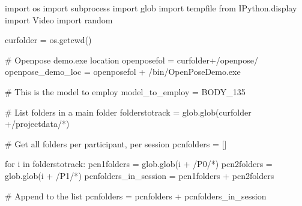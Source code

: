 \documentclass[
  letterpaper,
  DIV=11,
  numbers=noendperiod]{scrreprt}
\newenvironment{Shaded}{\begin{snugshade}}{\end{snugshade}}
\newcommand{\CommentTok}[1]{\textcolor[rgb]{0.37,0.37,0.37}{#1}}
\newcommand{\ControlFlowTok}[1]{\textcolor[rgb]{0.00,0.23,0.31}{#1}}
\newcommand{\ImportTok}[1]{\textcolor[rgb]{0.00,0.46,0.62}{#1}}
\newcommand{\KeywordTok}[1]{\textcolor[rgb]{0.00,0.23,0.31}{#1}}
\newcommand{\NormalTok}[1]{\textcolor[rgb]{0.00,0.23,0.31}{#1}}
\newcommand{\OperatorTok}[1]{\textcolor[rgb]{0.37,0.37,0.37}{#1}}
\newcommand{\StringTok}[1]{\textcolor[rgb]{0.13,0.47,0.30}{#1}}
\begin{document}
\begin{Shaded}
\begin{Highlighting}[]
\ImportTok{import}\NormalTok{ os}
\ImportTok{import}\NormalTok{ subprocess}
\ImportTok{import}\NormalTok{ glob}
\ImportTok{import}\NormalTok{ tempfile}
\ImportTok{from}\NormalTok{ IPython.display }\ImportTok{import}\NormalTok{ Video}
\ImportTok{import}\NormalTok{ random}

\NormalTok{curfolder }\OperatorTok{=}\NormalTok{ os.getcwd()}

\CommentTok{\# Openpose demo.exe location}
\NormalTok{openposefol }\OperatorTok{=}\NormalTok{ curfolder}\OperatorTok{+}\StringTok{\textquotesingle{}/openpose/\textquotesingle{}}
\NormalTok{openpose\_demo\_loc }\OperatorTok{=}\NormalTok{ openposefol }\OperatorTok{+} \StringTok{\textquotesingle{}/bin/OpenPoseDemo.exe\textquotesingle{}}

\CommentTok{\# This is the model to employ}
\NormalTok{model\_to\_employ }\OperatorTok{=} \StringTok{\textquotesingle{}BODY\_135\textquotesingle{}}

\CommentTok{\# List folders in a main folder}
\NormalTok{folderstotrack }\OperatorTok{=}\NormalTok{ glob.glob(curfolder }\OperatorTok{+}\StringTok{\textquotesingle{}/projectdata/*\textquotesingle{}}\NormalTok{)}

\CommentTok{\# Get all folders per participant, per session}
\NormalTok{pcnfolders }\OperatorTok{=}\NormalTok{ []}

\ControlFlowTok{for}\NormalTok{ i }\KeywordTok{in}\NormalTok{ folderstotrack:}
\NormalTok{    pcn1folders }\OperatorTok{=}\NormalTok{ glob.glob(i }\OperatorTok{+} \StringTok{\textquotesingle{}/P0/*\textquotesingle{}}\NormalTok{)}
\NormalTok{    pcn2folders }\OperatorTok{=}\NormalTok{ glob.glob(i }\OperatorTok{+} \StringTok{\textquotesingle{}/P1/*\textquotesingle{}}\NormalTok{)}
\NormalTok{    pcnfolders\_in\_session }\OperatorTok{=}\NormalTok{ pcn1folders }\OperatorTok{+}\NormalTok{ pcn2folders}

    \CommentTok{\# Append to the list}
\NormalTok{    pcnfolders }\OperatorTok{=}\NormalTok{ pcnfolders }\OperatorTok{+}\NormalTok{ pcnfolders\_in\_session}


\end{Highlighting}
\end{Shaded}
\end{document}
